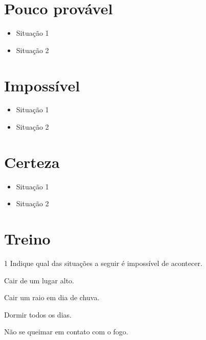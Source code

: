 \section*{Pouco provável}

\begin{itemize}
\item Situação 1
\end{itemize}

\begin{itemize}
\item Situação 2
\end{itemize}

\section*{Impossível}

\begin{itemize}
\item Situação 1
\end{itemize}

\begin{itemize}
\item Situação 2
\end{itemize}

\section*{Certeza}

\begin{itemize}
\item Situação 1
\end{itemize}

\begin{itemize}
\item Situação 2
\end{itemize}

\vspace*{+1em}

\section*{Treino}

\num{1} Indique qual das situações a seguir é impossível de acontecer.

\begin{escolha}[itemsep=-5pt]
\item Cair de um lugar alto.

\item Cair um raio em dia de chuva.

\item Dormir todos os dias.

\item Não se queimar em contato com o fogo.
\end{escolha}


